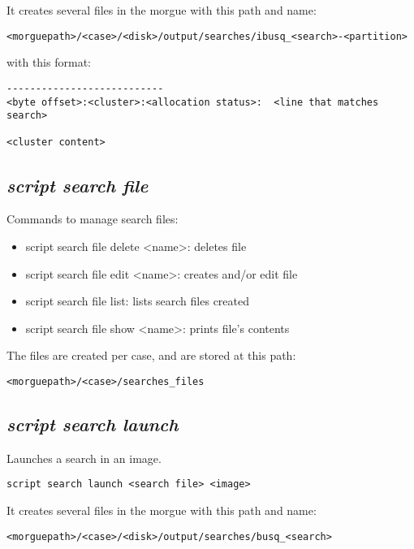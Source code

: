 \documentclass[a4paper,11pt,oneside]{report}
\begin{document}
It creates several files in the morgue with this path and name:

\begin{verbatim}
<morguepath>/<case>/<disk>/output/searches/ibusq_<search>-<partition>
\end{verbatim}

with this format:

\begin{verbatim}
---------------------------
<byte offset>:<cluster>:<allocation status>:  <line that matches search>

<cluster content>
\end{verbatim}


\subsection{\emph{script search file}}

Commands to manage search files:

\begin{itemize}
\item	script search file delete <name>:  deletes file
\item	script search file edit <name>:  creates and/or edit file
\item	script search file list:  lists search files created
\item	script search file show <name>:  prints file's contents
\end{itemize}

The files are created per case, and are stored at this path:

\begin{verbatim}
<morguepath>/<case>/searches_files
\end{verbatim}


\subsection{\emph{script search launch}}

Launches a search in an image. 

\begin{verbatim}
script search launch <search file> <image>
\end{verbatim}

It creates several files in the morgue with this path and name:

\begin{verbatim}
<morguepath>/<case>/<disk>/output/searches/busq_<search>
\end{verbatim}
\end{document}
